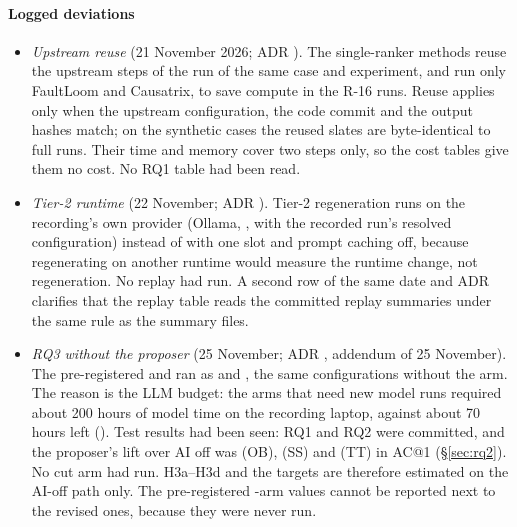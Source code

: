 \paragraph{Logged deviations}
\begin{itemize}
\item \emph{Upstream reuse} (21 November 2026; ADR \allowbreak{}\allowbreak{}). The single-ranker methods  reuse the upstream steps of the  run of the same case and experiment, and run only FaultLoom and Causatrix, to save compute in the R-16 runs. Reuse applies only when the upstream configuration, the code commit and the output hashes match; on the synthetic cases the reused slates are byte-identical to full runs. Their time and memory cover two steps only, so the cost tables give them no cost. No RQ1 table had been read.
\item \emph{Tier-2 runtime} (22 November; ADR \allowbreak{}). Tier-2 regeneration runs on the recording's own provider (Ollama, , with the recorded run's resolved configuration) instead of  with one slot and prompt caching off, because regenerating on another runtime would measure the runtime change, not regeneration. No replay had run. A second row of the same date and ADR clarifies that the replay table reads the committed replay summaries under the same rule as the summary files.
\item \emph{RQ3 without the proposer} (25 November; ADR \allowbreak{}, addendum of 25 November). The pre-registered  and  ran as \allowbreak{} and \allowbreak{}, the same configurations without the  arm. The reason is the LLM budget: the arms that need new model runs required about 200 hours of model time on the recording laptop, against about 70 hours left (\estimate). Test results had been seen: RQ1 and RQ2 were committed, and the proposer's lift over AI off was  (OB),  (SS) and  (TT) in AC@1 (\S\ref{sec:rq2}). No cut arm had run. H3a--H3d and the \NOFAULT targets are therefore estimated on the AI-off path only. The pre-registered -arm values cannot be reported next to the revised ones, because they were never run.

\end{itemize}

